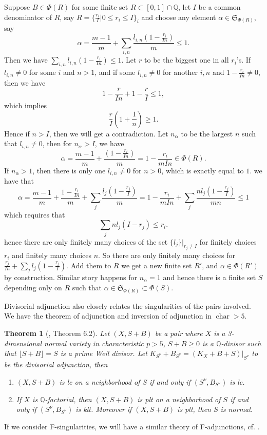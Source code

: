 \documentclass[letterpaper,reqno,12pt]{amsart}
\DeclareMathOperator{\chara}{char}
\numberwithin{equation}{section}
\theoremstyle{plain}
\newtheorem{theorem}{Theorem}[section]
\begin{document}
Suppose $B\in\Phi(R)$ for some finite set $R\subset[0,1]\cap {\mathbb Q}$, let $I$ be a common denominator of $R$, say $R=\{\frac{r_i}{I}|0\leq r_i\leq I\}_i$ and choose any element $\alpha\in \mathfrak S_{\Phi(R)}$, say
\[\alpha=\frac{m-1}{m}+\sum_{i,n}\frac{l_{i,n}(1-\frac{r_i}{In})}{m}\leq 1.\]
Then we have $\sum\limits_{i,n}l_{i,n}(1-\frac{r_i}{In})\leq 1$. Let $r$ to be the biggest one in all $r_i$'s. If $l_{i,n}\neq 0$ for some $i$ and $n>1$, and if some $l_{i,n}\neq 0$ for another $i,n$ and $1-\frac{r_i}{In}\neq 0$, then we have \[1-\frac{r}{In}+1-\frac{r}{I}\leq 1,\] which implies
\[\frac{r}{I}(1+\frac{1}{n})\geq 1.\]
Hence if $n>I$, then we will get a contradiction. Let $n_\alpha$ to be the largest $n$ such that $l_{i,n}\neq 0$, then for $n_\alpha>I$, we have
\[\alpha=\frac{m-1}{m}+\frac{(1-\frac{r_i}{In})}{m}=1-\frac{r_i}{mIn}\in\Phi(R).\]
If $n_\alpha>1$, then there is only one $l_{i,n}\neq 0$ for $n>0$, which is exactly equal to $1$. we have that
\[\alpha=\frac{m-1}{m}+\frac{1-\frac{r_i}{In}}{m}+\sum_j\frac{l_j(1-\frac{r_j}{I})}{m}=1-\frac{r_i}{mIn}+\sum_j\frac{nl_j(1-\frac{r_j}{I})}{mn}\leq 1\]
which requires that \[\sum_j nl_j(I-r_j)\leq r_i.\]
hence there are only finitely many choices of the set $\{l_j\}|_{r_j\neq I}$ for finitely choices $r_i$ and finitely many choices $n$. So there are only finitely many choices for $\frac{r_j}{In}+\sum\limits_jl_j(1-\frac{r_j}{I})$. Add them to $R$ we get a new finite set $R'$, and $\alpha\in\Phi(R')$ by construction. Similar story happens for $n_\alpha=1$ and hence there is a finite set $S$ depending only on $R$ such that $\alpha\in\mathfrak S_{\Phi(R)}\subset \Phi(S)$.

Divisorial adjunction also closely relates the singularities of the pairs involved. We have the theorem of adjunction and inversion of adjunction in $\chara>5$.

\begin{theorem}[\cite{threedimmmp}, Theorem 6.2]\label{divadj2}
    Let $(X, S + B)$ be a pair where $X$ is a 3-dimensional normal variety in characteristic $p > 5$, $S+B\geq 0$ is a ${\mathbb Q}$-divisor such that $\lfloor S + B\rfloor = S$ is a prime Weil divisor. Let $K_{S^\nu}+B_{S^\nu}=(K_X+B+S)|_{S^\nu}$ to be the divisorial adjunction, then
    \begin{enumerate}
        \item $(X,S+B)$ is lc on a neighborhood of $S$ if and only if $(S^\nu,B_{S^\nu})$ is lc.
        \item If $X$ is ${\mathbb Q}$-factorial, then $(X,S+B)$ is plt on a neighborhood of $S$ if and only if $(S^\nu, B_{S^\nu})$ is klt. Moreover if $(X,S+B)$ is plt, then $S$ is normal.
    \end{enumerate}
\end{theorem}
If we consider F-singularities, we will have a similar theory of F-adjunctions, cf. \cite{Das_2016}. 
\end{document}
